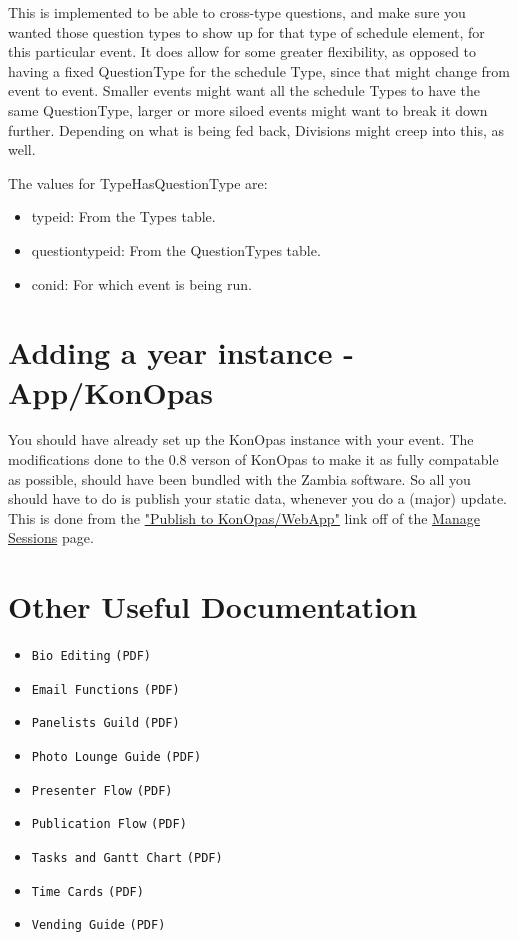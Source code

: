 \documentclass[captions=tablesignature]{scrartcl}
\begin{document}
This is implemented to be able to cross-type questions, and make
sure you wanted those question types to show up for that type of
schedule element, for this particular event.  It does allow for
some greater flexibility, as opposed to having a fixed QuestionType
for the schedule Type, since that might change from event to event.
Smaller events might want all the schedule Types to have the same
QuestionType, larger or more siloed events might want to break it
down further.  Depending on what is being fed back, Divisions might
creep into this, as well.

The values for TypeHasQuestionType are:
\begin{itemize}
\item typeid: From the Types table.
\item questiontypeid: From the QuestionTypes table.
\item conid: For which event is being run.
\end{itemize}

\section{Adding a year instance - App/KonOpas}
\label{sec-16}

You should have already set up the KonOpas instance with your
event.  The modifications done to the 0.8 verson of KonOpas to make
it as fully compatable as possible, should have been bundled with
the Zambia software.  So all you should have to do is publish your
static data, whenever you do a (major) update.  This is done from
the \href{../webpages/KonOpasData.php}{"Publish to KonOpas/WebApp"} link off of the \href{../webpages/StaffManageSessions.php}{Manage Sessions} page.

\section{Other Useful Documentation}
\label{sec-17}
\begin{itemize}
\item \texttt{Bio Editing} \texttt{(PDF)}
\item \texttt{Email Functions} \texttt{(PDF)}
\item \texttt{Panelists Guild} \texttt{(PDF)}
\item \texttt{Photo Lounge Guide} \texttt{(PDF)}
\item \texttt{Presenter Flow} \texttt{(PDF)}
\item \texttt{Publication Flow} \texttt{(PDF)}
\item \texttt{Tasks and Gantt Chart} \texttt{(PDF)}
\item \texttt{Time Cards} \texttt{(PDF)}
\item \texttt{Vending Guide} \texttt{(PDF)}
\end{itemize}
\end{document}
